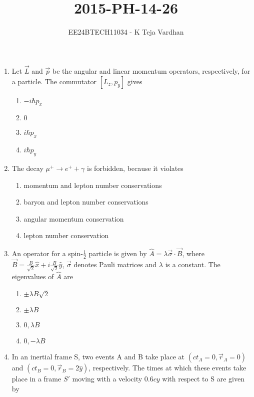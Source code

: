 \documentclass[journal]{IEEEtran}
\newcommand{\brak}[1]{\left( #1 \right)}
\newcommand{\sbrak}[1]{\left[ #1 \right]}
\begin{document}

\title{2015-PH-14-26}
\author{EE24BTECH11034 - K Teja Vardhan}
{\let\newpage\relax\maketitle}


\begin{enumerate}

\item Let $\vec{L}$ and $\vec{p}$ be the angular and linear momentum operators, respectively, for a particle. The commutator $\sbrak{L_z, p_y}$ gives

\begin{enumerate}
    \item $-i\hbar p_x$
    \item $0$
    \item $i\hbar p_x$
    \item $i\hbar p_y$
\end{enumerate}

\item The decay $\mu^+ \rightarrow e^+ + \gamma$ is forbidden, because it violates

\begin{enumerate}
    \item momentum and lepton number conservations
    \item baryon and lepton number conservations
    \item angular momentum conservation
    \item lepton number conservation
\end{enumerate}

\item An operator for a spin-$\frac{1}{2}$ particle is given by $\hat{A}=\lambda \vec{\sigma} \cdot \vec{B}$, where $\vec{B}=\frac{B}{\sqrt{2}}\hat{x}+i\frac{B}{\sqrt{2}}\hat{y}$, $\vec{\sigma}$ denotes Pauli matrices and $\lambda$ is a constant. The eigenvalues of $\hat{A}$ are

\begin{enumerate}
    \item $\pm \lambda B \sqrt{2}$
    \item $\pm \lambda B$
    \item $0, \lambda B$
    \item $0, -\lambda B$
\end{enumerate}

\item In an inertial frame S, two events A and B take place at $\brak{ct_A = 0, \vec{r}_A = 0}$ and $\brak{ct_B = 0, \vec{r}_B = 2\hat{y}}$, respectively. The times at which these events take place in a frame $S'$ moving with a velocity $0.6cy$ with respect to S are given by


\end{enumerate}
\end{document}
